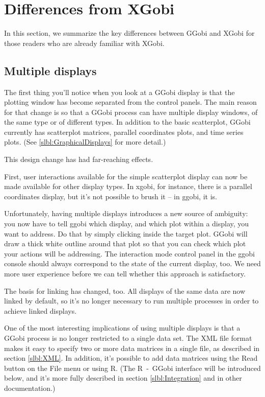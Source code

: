 \documentclass[11pt]{article}
\begin{document}
{\newpage
\section{Differences from XGobi}
\label{slbl:xgobi}

In this section, we summarize the key differences between GGobi
and XGobi for those readers who are already familiar with XGobi.

\subsection {Multiple displays}

The first thing you'll notice when you look at a GGobi display is
that the plotting window has become separated from the control
panels.  The main reason for that change is so that a GGobi process
can have multiple display windows, of the same type or of different
types.  In addition to the basic scatterplot, GGobi currently has
scatterplot matrices, parallel coordinates plots, and time series
plots.  (See \ref{slbl:GraphicalDisplays} for more detail.)

This design change has had far-reaching effects.

First, user interactions available for the simple scatterplot display
can now be made available for other display types.  In xgobi, for
instance, there is a parallel coordinates display, but it's not
possible to brush it -- in ggobi, it is.

Unfortunately, having multiple displays introduces a new source of
ambiguity: you now have to tell ggobi which display, and which plot
within a display, you want to address.  Do that by simply clicking
inside the target plot.  GGobi will draw a thick white outline around
that plot so that you can check which plot your actions will be
addressing.  The interaction mode control panel in the ggobi console
should always correspond to the state of the current display, too.  We
need more user experience before we can tell whether this approach is
satisfactory.

The basis for linking has changed, too.  All displays of the same data
are now linked by default, so it's no longer necessary to run
multiple processes in order to achieve linked displays.

One of the most interesting implications of using multiple displays
is that a GGobi process is no longer restricted to a single data
set.  The XML file format makes it easy to specify two or more data
matrices in a single file, as described in section \ref{slbl:XML}.
In addition, it's possible to add data matrices using the Read button
on the File menu or using R.  (The R~-~GGobi interface will be
introduced below, and it's more fully described in section
\ref{slbl:Integration} and in other documentation.)

}
\end{document}
